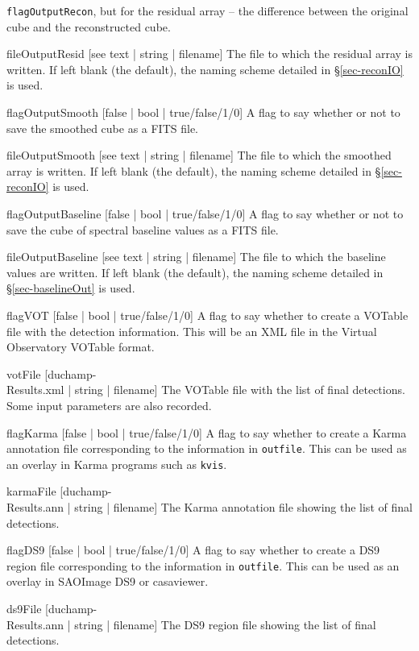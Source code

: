 \begin{Lentry}
  \texttt{flagOutputRecon}, but for the residual array -- the
  difference between the original cube and the reconstructed cube. 
\item[fileOutputResid{ [see text | string | filename]}] The file to
  which the residual array is written. If left blank (the default),
  the naming scheme detailed in \S\ref{sec-reconIO} is used.
\item[{flagOutputSmooth [false | bool | true/false/1/0]}] A flag to
  say whether or not to save the smoothed cube as a FITS file.
\item[fileOutputSmooth{ [see text | string | filename]}] The file to
  which the smoothed array is written. If left blank (the default),
  the naming scheme detailed in \S\ref{sec-reconIO} is used.
\item[{flagOutputBaseline [false | bool | true/false/1/0]}] A flag to
  say whether or not to save the cube of spectral baseline values as a
  FITS file.
\item[fileOutputBaseline{ [see text | string | filename]}] The file to
  which the baseline values are written. If left blank (the default),
  the naming scheme detailed in \S\ref{sec-baselineOut} is used.
\item[{flagVOT [false | bool | true/false/1/0]}] A flag to say whether
  to create a VOTable file with the detection information. This will
  be an XML file in the Virtual Observatory VOTable format.
\item[{votFile [duchamp-\\Results.xml | string | filename]}] The
  VOTable file with the list of final detections. Some input
  parameters are also recorded.
\item[{flagKarma [false | bool | true/false/1/0]}] A flag to say
  whether to create a Karma annotation file corresponding to the
  information in \texttt{outfile}. This can be used as an overlay in
  Karma programs such as \texttt{kvis}.
\item[{karmaFile [duchamp-\\Results.ann | string | filename]}] The
  Karma annotation file showing the list of final detections.
\item[{flagDS9 [false | bool | true/false/1/0]}] A flag to say whether
  to create a DS9 region file corresponding to the information in
  \texttt{outfile}. This can be used as an overlay in SAOImage DS9 or
  casaviewer.
\item[{ds9File [duchamp-\\Results.ann | string | filename]}] The DS9
  region file showing the list of final detections.

\end{Lentry}
